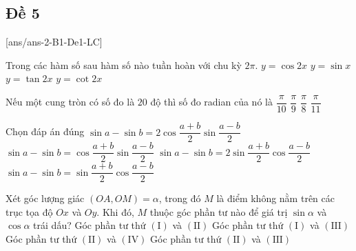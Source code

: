 \subsection{Đề 5}
[ans/ans-2-B1-De1-LC]
\caulc
\begin{ex}%
	Trong các hàm số sau hàm số nào tuần hoàn với chu kỳ $2\pi $.
	\choice
	{$y= \cos 2x$}
	{\True $y= \sin x$}
	{$y= \tan 2x$}
	{$y= \cot 2x$}
\end{ex}

\begin{ex}%
	Nếu một cung tròn có số đo là $20$ độ thì số đo radian của nó là 
	\choice
	{$\dfrac{\pi}{10}$}
	{\True $\dfrac{\pi}{9}$}
	{$\dfrac{\pi}{8}$}
	{$\dfrac{\pi}{11}$}
\end{ex}

\begin{ex}%
	Chọn đáp án đúng
		\choice 
		{\True $\sin a-\sin b=2 \cos \dfrac{a+b}{2} \sin \dfrac{a-b}{2}$}
		{$\sin a-\sin b=\cos \dfrac{a+b}{2} \sin \dfrac{a-b}{2}$}
		{$\sin a-\sin b=2 \sin \dfrac{a+b}{2} \cos \dfrac{a-b}{2}$}
		{$\sin a-\sin b=\sin \dfrac{a+b}{2} \cos \dfrac{a-b}{2}$}
\end{ex}

\begin{ex}%
	Xét góc lượng giác $(OA,OM)=\alpha$, trong đó $M$ là điểm không nằm trên các trục tọa độ $Ox$ và $Oy$. Khi đó, $M$ thuộc góc phần tư nào để giá trị $\sin \alpha$ và $\cos \alpha$ trái dấu?
	\choice
	{Góc phần tư thứ $(\text{I})$ và $(\text{II})$}
	{Góc phần tư thứ $(\text{I})$ và $(\text{III})$}
	{\True Góc phần tư thứ $(\text{II})$ và $(\text{IV})$}
	{Góc phần tư thứ $(\text{II})$ và $(\text{III})$}
\end{ex}

